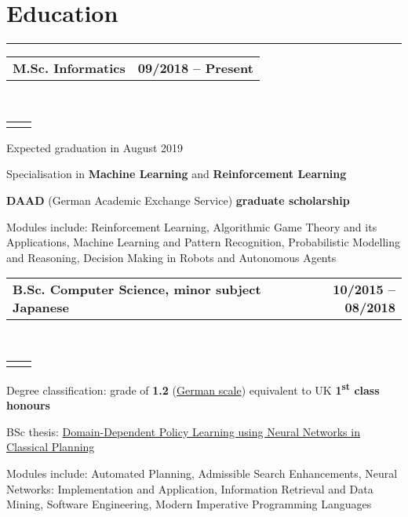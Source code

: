 \documentclass[]{deedy-resume}
\makeatletter
\newcommand{\headerrow}[2]
{\begin{tabular*}{\linewidth}{l@{\extracolsep{\fill}}r}
	\fontspec{Helvetica}\fontsize{12pt}{12pt}\selectfont\bfseries{\color{subheadings}#1} &
	\fontspec{Helvetica}\fontsize{12pt}{12pt}\selectfont\bfseries{\color{subheadings}#2} \\
\end{tabular*}}
\newcommand{\locationrow}[2]
{\begin{tabular*}{\linewidth}{l@{\extracolsep{\fill}}r}
        \color{headings}\scshape\fontspec{Heiti TC Medium}\fontsize{10pt}{12pt}\selectfont{#1}  &
        \color{headings}\scshape\fontspec{Heiti TC Medium}\fontsize{10pt}{12pt}\selectfont{#2}  \\
\end{tabular*}}
\makeatother
\begin{document}
\section*{Education}
\hrule
\vspace{0.4em}

\noindent
\headerrow{M.Sc. Informatics}{09/2018 -- Present}
\\
\locationrow{University of Edinburgh}{Edinburgh, United Kingdom}
\begin{tightitemize}{1.7em}
    \item Expected graduation in August 2019
    \item Specialisation in \textbf{Machine Learning} and \textbf{Reinforcement Learning}
    \item \textbf{DAAD} (German Academic Exchange Service) \textbf{graduate scholarship}
    \item Modules include: Reinforcement Learning, Algorithmic Game Theory and its Applications, Machine Learning and 
    Pattern Recognition, Probabilistic Modelling and Reasoning, Decision Making in Robots and Autonomous Agents
\end{tightitemize}
\largesectionsep

\noindent
\headerrow{B.Sc. Computer Science, minor subject Japanese}{10/2015 -- 08/2018}
\\
\locationrow{Saarland University}{Saarbrücken, Germany}
\begin{tightitemize}{1.7em}
    \item Degree classification: grade of \textbf{1.2} (\href{https://en.wikipedia.org/wiki/Academic_grading_in_Germany}{German scale}) equivalent to UK \textbf{1\textsuperscript{st} class honours}
    \item BSc thesis: \href{https://www.lukaschaefer.de/assets/files/thesis.pdf}{Domain-Dependent Policy Learning using Neural Networks in Classical Planning}
    \item Modules include: Automated Planning, Admissible Search Enhancements, Neural Networks: Implementation and Application, Information Retrieval and Data Mining, Software Engineering, Modern Imperative Programming Languages
\end{tightitemize}
\largesectionsep
\end{document}
